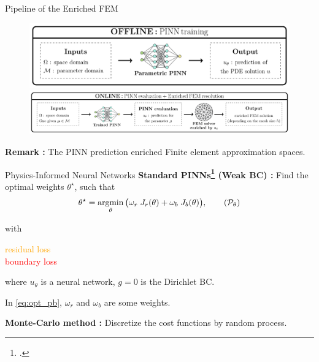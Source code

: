 \begin{frame}{Pipeline of the Enriched FEM}
	\begin{figure}[!ht]
		\centering
		\includegraphics[width=0.7\linewidth]{images/intro/pipeline/offline.pdf}

		\includegraphics[width=\linewidth]{images/intro/pipeline/online.pdf}
	\end{figure}

	\textbf{Remark :} The PINN prediction enriched Finite element approximation spaces.
\end{frame}

\begin{frame}{Physics-Informed Neural Networks}
	\textbf{Standard PINNs\footcite{RAISSI2019686} (Weak BC) :} Find the optimal weights $\theta^\star$, such that
	\begin{equation}
		\label{eq:opt_pb}
		\theta^\star = \argmin_{\theta}	\big( \omega_r \; J_r(\theta) + \omega_b \; J_b(\theta) \big),
		\tag{$\mathcal{P}_\theta$}
	\end{equation}

	\vspace{-5pt}
	with
	\vspace{5pt}

	\begin{minipage}{0.2\linewidth}
		\flushright
		\textcolor{orange}{residual loss} \\
		\vspace{3pt}
		\textcolor{red}{boundary loss}
	\end{minipage}
	\begin{minipage}{0.68\linewidth}
		\centering
		
		\vspace{3pt}
	\end{minipage}
	
	\vspace{5pt}
	where $u_\theta$ is a neural network, $g=0$ is the Dirichlet BC. 

	\vspace{2pt}
	In \eqref{eq:opt_pb}, $\omega_r$ and $\omega_b$ are some weights.

	\vspace{5pt}
	\textbf{Monte-Carlo method :} Discretize the cost functions by random process.
	\vspace{15pt}
\end{frame}

